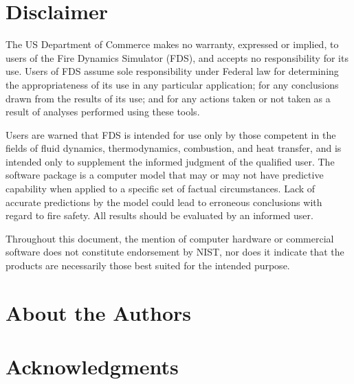 \documentclass[11pt]{book}
\begin{document}
\chapter{Disclaimer}

The US Department of Commerce makes no warranty, expressed or implied, to
users of the Fire Dynamics Simulator (FDS), and accepts no responsibility for its
use. Users of FDS assume sole responsibility under Federal law for
determining the appropriateness of its use in any particular application;
for any conclusions drawn from the results of its use; and for any actions
taken or not taken as a result of analyses performed using these tools.

Users are warned that FDS is intended for use only by those competent in
the fields of fluid dynamics, thermodynamics, combustion, and heat transfer,
and is intended only to supplement the
informed judgment of the qualified user. The software package is a
computer model that may or may not have predictive capability when applied
to a specific set of factual circumstances. Lack of accurate predictions by
the model could lead to erroneous conclusions with regard to fire safety.
All results should be evaluated by an informed user.

Throughout this document, the mention of computer hardware or
commercial software does not constitute endorsement by NIST, nor does
it indicate that the products are necessarily those best suited for the
intended purpose.


\chapter{About the Authors}

\begin{description}
\kmcgrattanbio
\rmcdermottbio
\shostikkabio
\jfloydbio
\end{description}


\chapter{Acknowledgments}
\end{document}
